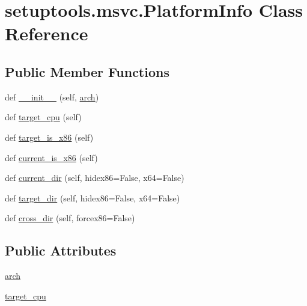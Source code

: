 \hypertarget{classsetuptools_1_1msvc_1_1PlatformInfo}{}\section{setuptools.\+msvc.\+Platform\+Info Class Reference}
\label{classsetuptools_1_1msvc_1_1PlatformInfo}
\subsection*{Public Member Functions}
\begin{DoxyCompactItemize}
\item 
def \hyperlink{classsetuptools_1_1msvc_1_1PlatformInfo_aa98d6a4ffa306e85dba513ac18612492}{\+\_\+\+\_\+init\+\_\+\+\_\+} (self, \hyperlink{classsetuptools_1_1msvc_1_1PlatformInfo_a35417db9c47564d7101f92145515092c}{arch})
\item 
def \hyperlink{classsetuptools_1_1msvc_1_1PlatformInfo_a2c7d1dc5add6f0b2494e161f364c4644}{target\+\_\+cpu} (self)
\item 
def \hyperlink{classsetuptools_1_1msvc_1_1PlatformInfo_a33202c8f736ad183994d06b48b7afd6f}{target\+\_\+is\+\_\+x86} (self)
\item 
def \hyperlink{classsetuptools_1_1msvc_1_1PlatformInfo_a09c58742017714dfae07c6604e3f837b}{current\+\_\+is\+\_\+x86} (self)
\item 
def \hyperlink{classsetuptools_1_1msvc_1_1PlatformInfo_a5d8f69638b5c98cc654174f4c944d1ab}{current\+\_\+dir} (self, hidex86=False, x64=False)
\item 
def \hyperlink{classsetuptools_1_1msvc_1_1PlatformInfo_a8ff098933fbab72ab767191b392e486b}{target\+\_\+dir} (self, hidex86=False, x64=False)
\item 
def \hyperlink{classsetuptools_1_1msvc_1_1PlatformInfo_a9cd7bd8ff66ddc3b79fe7448c52f1504}{cross\+\_\+dir} (self, forcex86=False)
\end{DoxyCompactItemize}
\subsection*{Public Attributes}
\begin{DoxyCompactItemize}
\item 
\hyperlink{classsetuptools_1_1msvc_1_1PlatformInfo_a35417db9c47564d7101f92145515092c}{arch}
\item 
\hyperlink{classsetuptools_1_1msvc_1_1PlatformInfo_a5bcf4cada8bfe500f75146ebcbfc1759}{target\+\_\+cpu}
\end{DoxyCompactItemize}
